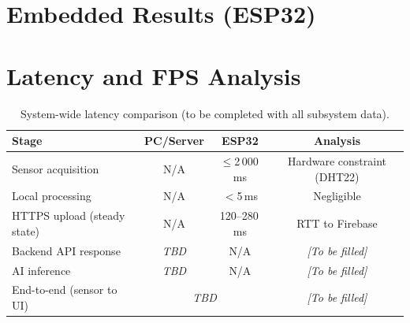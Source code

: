 \section{Embedded Results (ESP32)}


\section{Latency and FPS Analysis}


\begin{table}[H]
	\centering
	\caption{System-wide latency comparison (to be completed with all subsystem data).}
	\label{tab:latency_full}
	\begin{tabular}{lccc}
		\toprule
		\textbf{Stage}              & \textbf{PC/Server}               & \textbf{ESP32}          & \textbf{Analysis}           \\
		\midrule
		Sensor acquisition          & N/A                              & $\leq$2\,000\,ms        & Hardware constraint (DHT22) \\
		Local processing            & N/A                              & $<$5\,ms                & Negligible                  \\
		HTTPS upload (steady state) & N/A                              & 120--280\,ms            & RTT to Firebase             \\
		Backend API response        & \textit{TBD}                     & N/A                     & \textit{[To be filled]}     \\
		AI inference                & \textit{TBD}                     & N/A                     & \textit{[To be filled]}     \\
		End-to-end (sensor to UI)   & \multicolumn{2}{c}{\textit{TBD}} & \textit{[To be filled]}                               \\
		\bottomrule
	\end{tabular}
\end{table}

